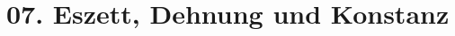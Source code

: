 \documentclass[handout,aspectratio=1610,dvipsnames]{beamer}
\begin{document}
  \section[Eszett\slash Konstanz]{07. Eszett, Dehnung und Konstanz}
  \let\woopsi\section\let\section\subsection\let\subsection\subsubsection
  
  \let\subsection\section\let\section\woopsi
  
\end{document}
